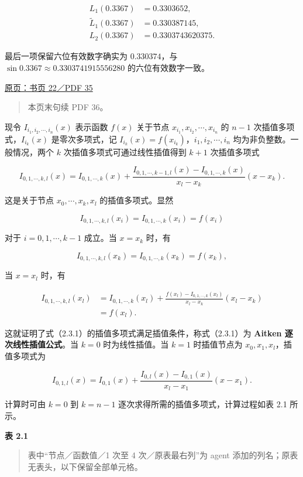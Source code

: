 \documentclass[
  10pt,
  fontset=fandol]{ctexart}
\begin{document}
\[
\begin{aligned}
L_1(0.3367)&=0.3303652,\\
\widetilde L_1(0.3367)&=0.330387145,\\
L_2(0.3367)&=0.3303743620375.
\end{aligned}
\]

最后一项保留六位有效数字确实为 \(0.330374\)，与 \(\sin0.3367\approx0.3303741915556280\) 的六位有效数字一致。

\href{../../source-images/pdf-035.jpeg}{原页：书页 22／PDF 35}

\begin{quote}
本页末句续 PDF 36。
\end{quote}

现令 \(I_{i_1,i_2,\cdots,i_n}(x)\) 表示函数 \(f(x)\) 关于节点 \(x_{i_1},x_{i_2},\cdots,x_{i_n}\) 的 \(n-1\) 次插值多项式，\(I_{i_k}(x)\) 是零次多项式，记 \(I_{i_k}(x)=f(x_{i_k})\)，\(i_1,i_2,\cdots,i_n\) 均为非负整数。一般情况，两个 \(k\) 次插值多项式可通过线性插值得到 \(k+1\) 次插值多项式

\[
I_{0,1,\cdots,k,l}(x)
=I_{0,1,\cdots,k}(x)
+\frac{I_{0,1,\cdots,k-1,l}(x)-I_{0,1,\cdots,k}(x)}
{x_l-x_k}(x-x_k).
\tag{2.3.1}
\]

这是关于节点 \(x_0,\cdots,x_k,x_l\) 的插值多项式。显然

\[
I_{0,1,\cdots,k,l}(x_i)=I_{0,1,\cdots,k}(x_i)=f(x_i)
\]

对于 \(i=0,1,\cdots,k-1\) 成立。当 \(x=x_k\) 时，有

\[
I_{0,1,\cdots,k,l}(x_k)=I_{0,1,\cdots,k}(x_k)=f(x_k),
\]

当 \(x=x_l\) 时，有

\[
\begin{aligned}
I_{0,1,\cdots,k,l}(x_l)
&=I_{0,1,\cdots,k}(x_l)
+\frac{f(x_l)-I_{0,1,\cdots,k}(x_l)}{x_l-x_k}(x_l-x_k)\\
&=f(x_l).
\end{aligned}
\]

这就证明了式（2.3.1）的插值多项式满足插值条件，称式（2.3.1）为 \textbf{Aitken 逐次线性插值公式}。当 \(k=0\) 时为线性插值。当 \(k=1\) 时插值节点为 \(x_0,x_1,x_l\)，插值多项式为

\[
I_{0,1,l}(x)=I_{0,1}(x)
+\frac{I_{0,l}(x)-I_{0,1}(x)}{x_l-x_1}(x-x_1).
\]

计算时可由 \(k=0\) 到 \(k=n-1\) 逐次求得所需的插值多项式，计算过程如表 2.1 所示。

\textbf{表 2.1}

\begin{quote}
表中``节点／函数值／1 次至 4 次／原表最右列''为 agent 添加的列名；原表无表头，以下保留全部单元格。
\end{quote}
\end{document}
